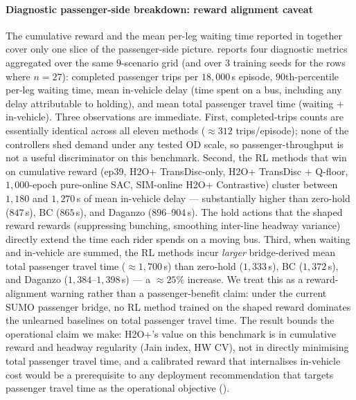 \paragraph{Diagnostic passenger-side breakdown: reward alignment caveat}
The cumulative reward and the mean per-leg waiting time reported in  together cover only one slice of the passenger-side picture.
 reports four diagnostic metrics aggregated over the same $9$-scenario grid (and over $3$ training seeds for the rows where $n=27$): completed passenger trips per $18{,}000$\,s episode, $90$th-percentile per-leg waiting time, mean in-vehicle delay (time spent on a bus, including any delay attributable to holding), and mean total passenger travel time (waiting + in-vehicle).
Three observations are immediate.
First, completed-trips counts are essentially identical across all eleven methods ($\approx 312$ trips/episode); none of the controllers shed demand under any tested OD scale, so passenger-throughput is not a useful discriminator on this benchmark.
Second, the RL methods that win on cumulative reward (ep39, H2O+ TransDisc-only, H2O+ TransDisc + Q-floor, $1{,}000$-epoch pure-online SAC, SIM-online H2O+ Contrastive) cluster between $1{,}180$ and $1{,}270$\,s of mean in-vehicle delay --- substantially higher than zero-hold ($847$\,s), BC ($865$\,s), and Daganzo ($896$--$904$\,s).
The hold actions that the shaped reward rewards (suppressing bunching, smoothing inter-line headway variance) directly extend the time each rider spends on a moving bus.
Third, when waiting and in-vehicle are summed, the RL methods incur \emph{larger} bridge-derived mean total passenger travel time ($\approx 1{,}700$\,s) than zero-hold ($1{,}333$\,s), BC ($1{,}372$\,s), and Daganzo ($1{,}384$--$1{,}398$\,s) --- a $\approx 25\%$ increase.
We treat this as a reward-alignment warning rather than a passenger-benefit claim: under the current SUMO passenger bridge, no RL method trained on the shaped reward dominates the unlearned baselines on total passenger travel time.
The result bounds the operational claim we make: H2O+'s value on this benchmark is in cumulative reward and headway regularity (Jain index, HW CV), not in directly minimising total passenger travel time, and a calibrated reward that internalises in-vehicle cost would be a prerequisite to any deployment recommendation that targets passenger travel time as the operational objective ().

